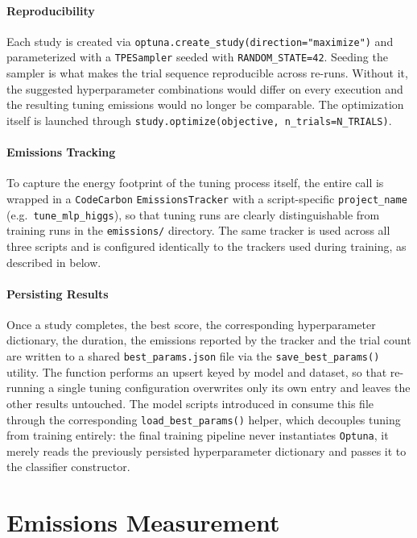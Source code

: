 \paragraph{Reproducibility}
Each study is created via \texttt{optuna.create\_study(direction="maximize")} and parameterized with a \texttt{TPESampler} seeded with \texttt{RANDOM\_STATE=42}. Seeding the sampler is what makes the trial sequence reproducible across re-runs. Without it, the suggested hyperparameter combinations would differ on every execution and the resulting tuning emissions would no longer be comparable. The optimization itself is launched through \texttt{study.optimize(objective, n\_trials=N\_TRIALS)}.

\paragraph{Emissions Tracking}
To capture the energy footprint of the tuning process itself, the entire  call is wrapped in a \texttt{CodeCarbon} \texttt{EmissionsTracker} with a script-specific \texttt{project\_name} (e.g.\ \texttt{tune\_mlp\_higgs}), so that tuning runs are clearly distinguishable from training runs in the \texttt{emissions/} directory. The same tracker is used across all three scripts and is configured identically to the trackers used during training, as described in  below.

\paragraph{Persisting Results}
Once a study completes, the best score, the corresponding hyperparameter dictionary, the duration, the emissions reported by the tracker and the trial count are written to a shared \texttt{best\_params.json} file via the \texttt{save\_best\_params()} utility. The function performs an upsert keyed by model and dataset, so that re-running a single tuning configuration overwrites only its own entry and leaves the other results untouched. The model scripts introduced in  consume this file through the corresponding \texttt{load\_best\_params()} helper, which decouples tuning from training entirely: the final training pipeline never instantiates \texttt{Optuna}, it merely reads the previously persisted hyperparameter dictionary and passes it to the classifier constructor.

\section{Emissions Measurement}
\label{implementation_emissions}

